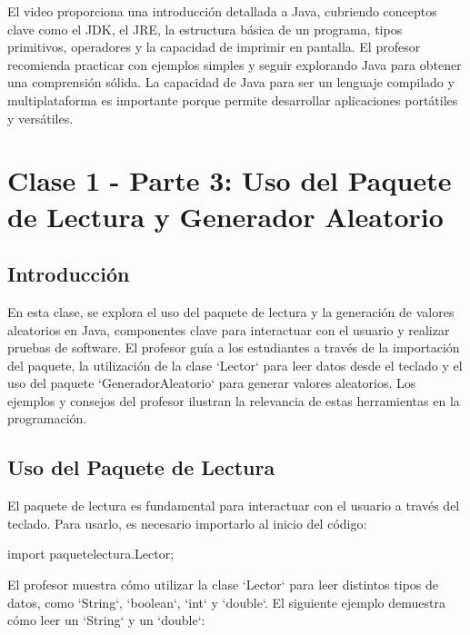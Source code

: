 \documentclass[a4paper]{report}
\begin{document}
El video proporciona una introducción detallada a Java, cubriendo conceptos clave como el JDK, el JRE, la estructura básica de un programa, tipos primitivos, operadores y la capacidad de imprimir en pantalla. El profesor recomienda practicar con ejemplos simples y seguir explorando Java para obtener una comprensión sólida. La capacidad de Java para ser un lenguaje compilado y multiplataforma es importante porque permite desarrollar aplicaciones portátiles y versátiles.

\newpage
\maketitle

\chapter{Clase 1 - Parte 3: Uso del Paquete de Lectura y Generador Aleatorio}
\section{Introducción}

En esta clase, se explora el uso del paquete de lectura y la generación de valores aleatorios en Java, componentes clave para interactuar con el usuario y realizar pruebas de software. El profesor guía a los estudiantes a través de la importación del paquete, la utilización de la clase `Lector` para leer datos desde el teclado y el uso del paquete `GeneradorAleatorio` para generar valores aleatorios. Los ejemplos y consejos del profesor ilustran la relevancia de estas herramientas en la programación.

\section{Uso del Paquete de Lectura}

El paquete de lectura es fundamental para interactuar con el usuario a través del teclado. Para usarlo, es necesario importarlo al inicio del código:

\begin{roundedlst}
import paquetelectura.Lector;
\end{roundedlst}

El profesor muestra cómo utilizar la clase `Lector` para leer distintos tipos de datos, como `String`, `boolean`, `int` y `double`. El siguiente ejemplo demuestra cómo leer un `String` y un `double`:
\end{document}
